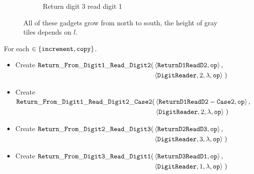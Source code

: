 \begin{figure}[H]
\begin{subfigure}[t]{0.2\textwidth}
                \caption{\label{fig:return_paths/return_digit1_read_digit2_general} Return digit 3 read digit 1}
            \end{subfigure}%
            \caption{\label{fig:return_path_same_row} All of these gadgets grow from north to south, the height of gray tiles depends on $l$.}
        \end{figure}

        \noindent For each {\inc} $\in \{ {\tt increment, copy } \}$.


        \begin{itemize}
            \item Create
            $\begin{aligned}[t]
                {\tt Return\_From\_Digit1\_Read\_Digit2}(& \left \langle {\tt ReturnD1ReadD2},          {\tt op} \right\rangle, \\
                                        & \left \langle {\tt DigitReader}, 2, \lambda, {\tt op} \right\rangle \;)
            \end{aligned}$

            \item Create
            $\begin{aligned}[t]
                {\tt Return\_From\_Digit1\_Read\_Digit2\_Case2}(& \left \langle {\tt ReturnD1ReadD2-Case2},    {\tt op} \right\rangle, \\
                                               & \left \langle {\tt DigitReader}, 2, \lambda, {\tt op} \right\rangle \;)
            \end{aligned}$

            \item Create
            $\begin{aligned}[t]
                {\tt Return\_From\_Digit2\_Read\_Digit3}(& \left \langle {\tt ReturnD2ReadD3},           {\tt op} \right\rangle, \\
                                          & \left \langle {\tt DigitReader},  3, \lambda, {\tt op} \right\rangle \;)
            \end{aligned}$

            \item Create
            $\begin{aligned}[t]
                 {\tt Return\_From\_Digit3\_Read\_Digit1}(& \left \langle {\tt ReturnD3ReadD1},           {\tt op} \right\rangle, \\
                                           & \left \langle {\tt DigitReader},  1, \lambda, {\tt op} \right\rangle \;)
            \end{aligned}$

        \end{itemize}


